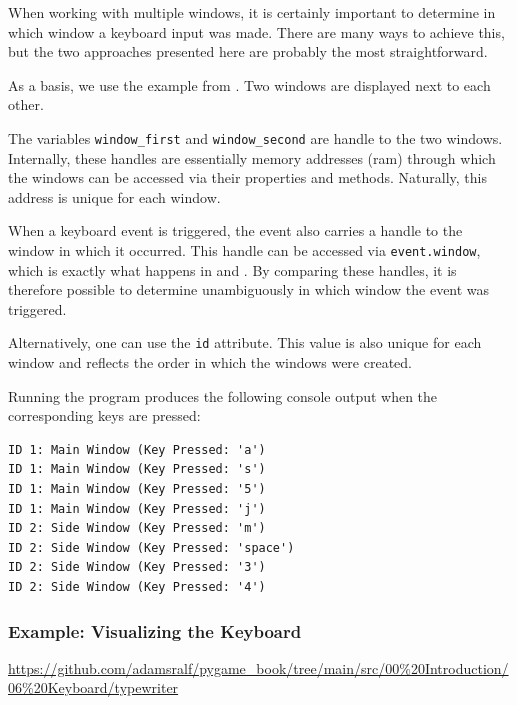 When working with multiple windows, it is certainly important to determine in which window a keyboard input was made. There are many ways to achieve this, but the two approaches presented here are probably the most straightforward.

As a basis, we use the example from . Two windows are displayed next to each other.

The variables \texttt{window\_first} and \texttt{window\_second} are handle to the two windows. Internally, these handles are essentially memory addresses (\gls{ram}) through which the windows can be accessed via their properties and methods. Naturally, this address is unique for each window.

When a keyboard event is triggered, the event also carries a handle to the window in which it occurred. This handle can be accessed via \texttt{event.window},  which is exactly what happens in  and . By comparing these handles, it is therefore possible to determine unambiguously in which window the event was triggered.

Alternatively, one can use the \texttt{id} attribute. This value is also unique for each window and reflects the order in which the windows were created.

\newpage
{}

Running the program produces the following console output when the corresponding keys are pressed:

\lstset{firstnumber=1}
\begin{lstlisting}
ID 1: Main Window (Key Pressed: 'a')
ID 1: Main Window (Key Pressed: 's')
ID 1: Main Window (Key Pressed: '5')
ID 1: Main Window (Key Pressed: 'j')
ID 2: Side Window (Key Pressed: 'm')
ID 2: Side Window (Key Pressed: 'space')
ID 2: Side Window (Key Pressed: '3')
ID 2: Side Window (Key Pressed: '4')	
\end{lstlisting}

\newpage
\subsubsection{Example: Visualizing the Keyboard}
\begin{diskbox}
	\url{https://github.com/adamsralf/pygame_book/tree/main/src/00%20Introduction/06%20Keyboard/typewriter}
\end{diskbox}

